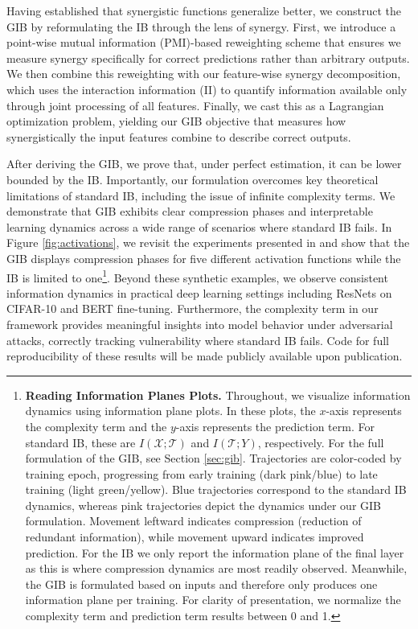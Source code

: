 \documentclass{article}
\theoremstyle{definition}
\theoremstyle{remark}
\begin{document}
Having established that synergistic functions generalize better, we construct the GIB by reformulating the IB through the lens of synergy. First, we introduce a point-wise mutual information (PMI)-based reweighting scheme that ensures we measure synergy specifically for correct predictions rather than arbitrary outputs. We then combine this reweighting with our feature-wise synergy decomposition, which uses the interaction information (II) to quantify information available only through joint processing of all features. Finally, we cast this as a Lagrangian optimization problem, yielding our GIB objective that measures how synergistically the input features combine to describe correct outputs.

After deriving the GIB, we prove that, under perfect estimation, it can be lower bounded by the IB. 
Importantly, our formulation overcomes key theoretical limitations of standard IB, including the issue of infinite complexity terms. We demonstrate that GIB exhibits clear compression phases and interpretable learning dynamics across a wide range of scenarios where standard IB fails. In Figure \ref{fig:activations}, we revisit the experiments presented in \cite{saxe2018information} and show that the GIB displays compression phases for five different activation functions while the IB is limited to one\footnote{\textbf{Reading Information Planes Plots.} Throughout, we visualize information dynamics using information plane plots. In these plots, the $x$-axis represents the complexity term and the $y$-axis represents the prediction term. For standard IB, these are $I(\mathcal{X};\mathcal{T})$ and $I(\mathcal{T};Y)$, respectively. For the full formulation of the GIB, see Section \ref{sec:gib}. Trajectories are color-coded by training epoch, progressing from early training (dark pink/blue) to late training (light green/yellow). Blue trajectories correspond to the standard IB dynamics, whereas pink trajectories depict the dynamics under our GIB formulation. Movement leftward indicates compression (reduction of redundant information), while movement upward indicates improved prediction. For the IB we only report the information plane of the final layer as this is where compression dynamics are most readily observed. Meanwhile, the GIB is formulated based on inputs and therefore only produces one information plane per training. For clarity of presentation, we normalize the complexity term and prediction term results between 0 and 1.}. Beyond these synthetic examples, we observe consistent information dynamics in practical deep learning settings including ResNets on CIFAR-10 and BERT fine-tuning. Furthermore, the complexity term in our framework provides meaningful insights into model behavior under adversarial attacks, correctly tracking vulnerability where standard IB fails. Code for full reproducibility of these results will be made publicly available upon publication.
\end{document}
